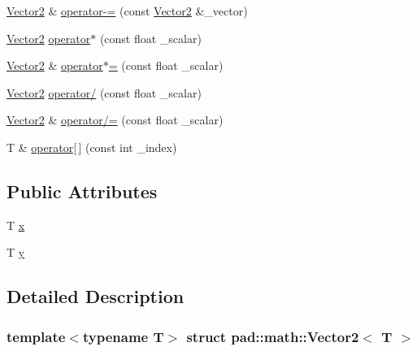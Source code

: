 \begin{DoxyCompactItemize}
\item 
\mbox{\hyperlink{structpad_1_1math_1_1_vector2}{Vector2}} \& \mbox{\hyperlink{structpad_1_1math_1_1_vector2_a03d8723e7dc2ecb94b1b7e65ecb59ebb}{operator-\/=}} (const \mbox{\hyperlink{structpad_1_1math_1_1_vector2}{Vector2}} \&\+\_\+vector)
\item 
\mbox{\hyperlink{structpad_1_1math_1_1_vector2}{Vector2}} \mbox{\hyperlink{structpad_1_1math_1_1_vector2_af6fa8a12be3dbf3cf27500df9eb93496}{operator$\ast$}} (const float \+\_\+scalar)
\item 
\mbox{\hyperlink{structpad_1_1math_1_1_vector2}{Vector2}} \& \mbox{\hyperlink{structpad_1_1math_1_1_vector2_a2560ceda08780dc1543b3367eda784e4}{operator$\ast$=}} (const float \+\_\+scalar)
\item 
\mbox{\hyperlink{structpad_1_1math_1_1_vector2}{Vector2}} \mbox{\hyperlink{structpad_1_1math_1_1_vector2_adc54031c4f4593cda1860f3fd0b3f1dc}{operator/}} (const float \+\_\+scalar)
\item 
\mbox{\hyperlink{structpad_1_1math_1_1_vector2}{Vector2}} \& \mbox{\hyperlink{structpad_1_1math_1_1_vector2_a7fa51370af7bcda161bc803d13e52789}{operator/=}} (const float \+\_\+scalar)
\item 
T \& \mbox{\hyperlink{structpad_1_1math_1_1_vector2_ade4a5148be7e09515cf10998aab7a5a0}{operator\mbox{[}$\,$\mbox{]}}} (const int \+\_\+index)
\end{DoxyCompactItemize}
\subsection*{Public Attributes}
\begin{DoxyCompactItemize}
\item 
T \mbox{\hyperlink{structpad_1_1math_1_1_vector2_a3d4fc9deec4a8fd923ea4f5f73dfb763}{x}}
\item 
T \mbox{\hyperlink{structpad_1_1math_1_1_vector2_a481eca28456d2e02f635059d379b89f5}{y}}
\end{DoxyCompactItemize}


\subsection{Detailed Description}
\subsubsection*{template$<$typename T$>$\newline
struct pad\+::math\+::\+Vector2$<$ T $>$}

